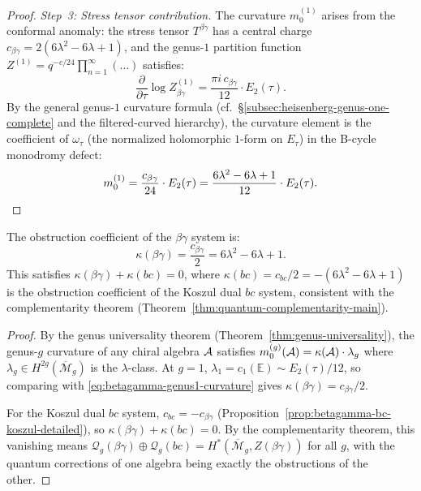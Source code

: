 \begin{proof}
\emph{Step~3: Stress tensor contribution.}
The curvature $m_0^{(1)}$ arises from the conformal anomaly: the
stress tensor $T^{\beta\gamma}$ has a central charge
$c_{\beta\gamma} = 2(6\lambda^2 - 6\lambda + 1)$, and the genus-$1$
partition function $Z^{(1)} = q^{-c/24} \prod_{n=1}^\infty
(\ldots)$ satisfies:
\begin{equation}\label{eq:dlog-Z}
\frac{\partial}{\partial \tau} \log Z^{(1)}_{\beta\gamma}
= \frac{\pi i \, c_{\beta\gamma}}{12} \cdot E_2(\tau).
\end{equation}
By the general genus-$1$ curvature formula
(cf.\ \S\ref{subsec:heisenberg-genus-one-complete} and
the filtered-curved hierarchy), the curvature element is the
coefficient of $\omega_\tau$ (the normalized holomorphic $1$-form
on $E_\tau$) in the B-cycle monodromy defect:
\[
m_0^{(1)} = \frac{c_{\beta\gamma}}{24} \cdot E_2(\tau)
= \frac{6\lambda^2 - 6\lambda + 1}{12} \cdot E_2(\tau). \qedhere
\]
\end{proof}

\begin{proposition}
\label{prop:betagamma-obstruction-coefficient}
The obstruction coefficient of the $\beta\gamma$ system is:
\begin{equation}\label{eq:betagamma-kappa}
\kappa(\beta\gamma) = \frac{c_{\beta\gamma}}{2}
= 6\lambda^2 - 6\lambda + 1.
\end{equation}
This satisfies $\kappa(\beta\gamma) + \kappa(bc) = 0$, where
$\kappa(bc) = c_{bc}/2 = -(6\lambda^2 - 6\lambda + 1)$ is the
obstruction coefficient of the Koszul dual $bc$ system, consistent
with the complementarity theorem
(Theorem~\ref{thm:quantum-complementarity-main}).
\end{proposition}

\begin{proof}
By the genus universality theorem
(Theorem~\ref{thm:genus-universality}), the genus-$g$ curvature
of any chiral algebra $\mathcal{A}$ satisfies
$m_0^{(g)}(\mathcal{A}) = \kappa(\mathcal{A}) \cdot \lambda_g$
where $\lambda_g \in H^{2g}(\overline{\mathcal{M}}_g)$ is the
$\lambda$-class.  At $g = 1$,
$\lambda_1 = c_1(\mathbb{E}) \sim E_2(\tau)/12$, so comparing with
\eqref{eq:betagamma-genus1-curvature} gives
$\kappa(\beta\gamma) = c_{\beta\gamma}/2$.

For the Koszul dual $bc$ system,
$c_{bc} = -c_{\beta\gamma}$
(Proposition~\ref{prop:betagamma-bc-koszul-detailed}),
so $\kappa(\beta\gamma) + \kappa(bc) = 0$.  By the
complementarity theorem, this vanishing means
$\mathcal{Q}_g(\beta\gamma) \oplus \mathcal{Q}_g(bc)
= H^*(\overline{\mathcal{M}}_g, Z(\beta\gamma))$
for all $g$, with the quantum corrections of one algebra
being exactly the obstructions of the other.
\end{proof}

